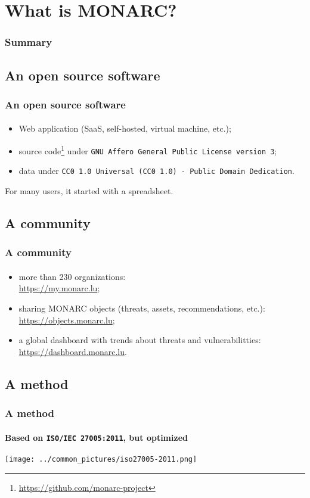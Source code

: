 %
%
\section{What is MONARC?}
\begin{frame}
    \frametitle{Summary}
\end{frame}
\subsection{An open source software}
\begin{frame}
\frametitle{An open source software}
\framesubtitle{}
    \begin{itemize}
        \item Web application (SaaS, self-hosted, virtual machine, etc.);
        \item source code\footnote{\url{https://github.com/monarc-project}}
            under \texttt{GNU Affero General Public License version 3};
        \item data under \texttt{CC0 1.0 Universal (CC0 1.0) - Public Domain Dedication}.
    \end{itemize}
    \bigskip
    For many users, it started with a spreadsheet.
\end{frame}

\subsection{A community}
\begin{frame}
\frametitle{A community}
\framesubtitle{}
  \begin{itemize}
    \item more than 230 organizations:\\ \url{https://my.monarc.lu};
    \item sharing MONARC objects (threats, assets, recommendations, etc.):\\
        \url{https://objects.monarc.lu};
    \item a global dashboard with trends about threats and vulnerabilitties:\\
        \url{https://dashboard.monarc.lu}.
  \end{itemize}
\end{frame}

\subsection{A method}
\begin{frame}
\frametitle{A method}
\framesubtitle{Based on \texttt{ISO/IEC 27005:2011}, but optimized}
    \begin{center}
        \texttt{[image: ../common\_pictures/iso27005-2011.png]}
    \end{center}
\end{frame}
